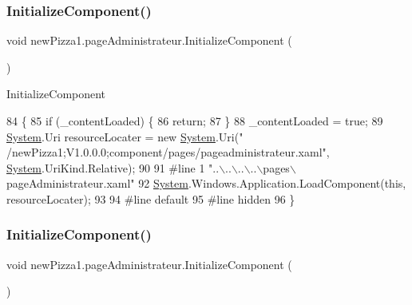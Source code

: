 \subsubsection{\texorpdfstring{Initialize\+Component()}{InitializeComponent()}\hspace{0.1cm}{\footnotesize\ttfamily [1/3]}}
{\footnotesize\ttfamily void new\+Pizza1.\+page\+Administrateur.\+Initialize\+Component (\begin{DoxyParamCaption}{ }\end{DoxyParamCaption})\hspace{0.3cm}{\ttfamily [inline]}}



Initialize\+Component 


\begin{DoxyCode}
84                                           \{
85             \textcolor{keywordflow}{if} (\_contentLoaded) \{
86                 \textcolor{keywordflow}{return};
87             \}
88             \_contentLoaded = \textcolor{keyword}{true};
89             \hyperlink{namespaceSystem}{System}.Uri resourceLocater = \textcolor{keyword}{new} \hyperlink{namespaceSystem}{System}.Uri(\textcolor{stringliteral}{"
      /newPizza1;V1.0.0.0;component/pages/pageadministrateur.xaml"}, \hyperlink{namespaceSystem}{System}.UriKind.Relative);
90             
91 \textcolor{preprocessor}{            #line 1 "..\(\backslash\)..\(\backslash\)..\(\backslash\)..\(\backslash\)pages\(\backslash\)pageAdministrateur.xaml"
}
92             \hyperlink{namespaceSystem}{System}.Windows.Application.LoadComponent(\textcolor{keyword}{this}, resourceLocater);
93             
94 \textcolor{preprocessor}{            #line default
}
95 \textcolor{preprocessor}{            #line hidden
}
96         \}
\end{DoxyCode}
\mbox{\label{classnewPizza1_1_1pageAdministrateur_a8ce68fc7fc92670f56ef3dabb906c9d0}} 
\subsubsection{\texorpdfstring{Initialize\+Component()}{InitializeComponent()}\hspace{0.1cm}{\footnotesize\ttfamily [2/3]}}
{\footnotesize\ttfamily void new\+Pizza1.\+page\+Administrateur.\+Initialize\+Component (\begin{DoxyParamCaption}{ }\end{DoxyParamCaption})\hspace{0.3cm}{\ttfamily [inline]}}



